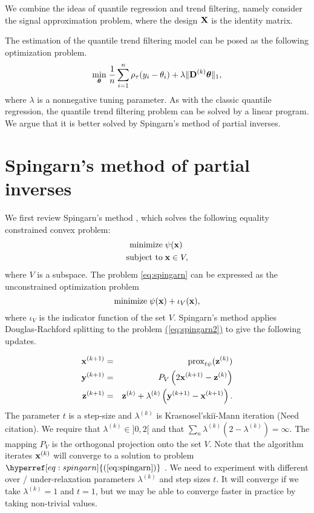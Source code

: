 \documentclass{article}
\newcommand{\Eqn}[1]{\hyperref[eq:#1]{{\rm (\ref*{eq:#1})}}} %
\newcommand{\Eqn}[1]{{(\ref{eq:#1})}} %
\newcommand{\V}[1]{{\bm{\mathbf{\MakeLowercase{#1}}}}} %
\newcommand{\VE}[2]{\MakeLowercase{#1}_{#2}} %
\newcommand{\Vn}[2]{\V{#1}^{(#2)}} %
\newcommand{\M}[1]{{\bm{\mathbf{\MakeUppercase{#1}}}}} %
\newcommand{\Mn}[2]{\M{#1}^{(#2)}} %
\newcommand{\prox}[2]{\operatorname{prox}_{#1}({#2})}
\begin{document}
We combine the ideas of quantile regression and trend filtering, namely consider the signal approximation problem, where the design $\M{X}$ is the identity matrix.

The estimation of the quantile trend filtering model can be posed as the following optimization problem.
\begin{eqnarray}
\label{eq:quantile_trend}
	\underset{\V{\theta}}{\min}\; \frac{1}{n} \sum_{i=1}^n \rho_\tau(\VE{y}{i} - \VE{\theta}{i}) + \lambda \lVert \Mn{D}{k} \V{\theta} \rVert_1,
\end{eqnarray}
where $\lambda$ is a nonnegative tuning parameter. As with the classic quantile regression, the quantile trend filtering problem can be solved by a linear program. We argue that it is better solved by Spingarn's method of partial inverses.

\section{Spingarn's method of partial inverses}

We first review Spingarn's method \cite{Spingarn1985}, which solves the following equality constrained convex problem:
\begin{equation}
\label{eq:spingarn}
\begin{split}
\text{minimize}\; & \psi(\V{x}) \\
\text{subject to}\; & \V{x} \in V,
\end{split}
\end{equation}
where $V$ is a subspace. The problem \ref{eq:spingarn} can be expressed as the unconstrained optimization problem
\begin{equation}
\label{eq:spingarn2}
\text{minimize}\; \psi(\V{x}) + \iota_V(\V{x}),
\end{equation}
where $\iota_V$ is the indicator function of the set $V$. Spingarn's method applies Douglas-Rachford splitting to the problem \Eqn{spingarn2} to give the following updates.

\begin{eqnarray*}
\Vn{x}{k+1} & = & \prox{t\psi}{\Vn{z}{k}} \\
\Vn{y}{k+1} & = & P_V\left(2\Vn{x}{k+1} - \Vn{z}{k} \right) \\
\Vn{z}{k+1} & = & \Vn{z}{k} + \lambda^{(k)}\left(\Vn{y}{k+1} - \Vn{x}{k+1} \right).
\end{eqnarray*}
The parameter $t$ is a step-size and $\lambda^{(k)}$ is Krasnosel'ski{\u i}-Mann iteration (Need citation). We require that $\lambda^{(k)} \in ]0, 2[$ and that $\sum_n \lambda^{(k)} (2-\lambda^{(k)}) = \infty$. The mapping $P_V$ is the orthogonal projection onto the set $V$.  Note that the algorithm iterates $\Vn{x}{k}$ will converge to a solution to problem $\Eqn{spingarn}$ \cite{Combettes2005}. We need to experiment with different over / under-relaxation parameters $\lambda^{(k)}$ and step sizes $t$. It will converge if we take $\lambda^{(k)} = 1$ and $t = 1$, but we may be able to converge faster in practice by taking non-trivial values.
\end{document}
